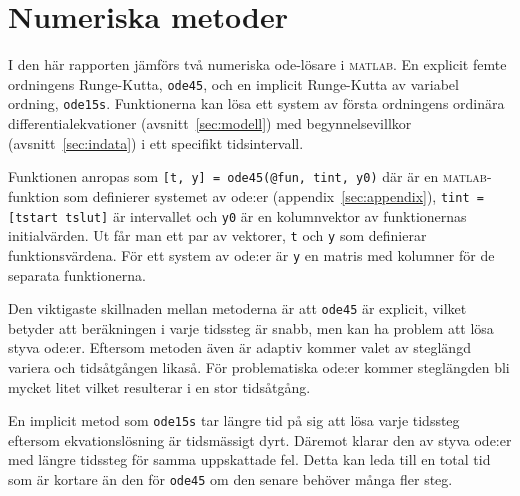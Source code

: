 \section{Numeriska metoder}
\label{sec:metoder}

I den här rapporten jämförs två numeriska ode-lösare i \textsc{matlab}. En explicit femte ordningens Runge-Kutta, \texttt{ode45}, och en implicit Runge-Kutta av variabel ordning, \texttt{ode15s}. Funktionerna kan lösa ett system av första ordningens ordinära differentialekvationer (avsnitt~\ref{sec:modell}) med begynnelsevillkor (avsnitt~\ref{sec:indata}) i ett specifikt tidsintervall.

Funktionen anropas som \texttt{[t, y] = ode45(@fun, tint, y0)} där  är en \textsc{matlab}-funktion som definierer systemet av ode:er (appendix~\ref{sec:appendix}), \texttt{tint = [tstart tslut]} är intervallet och \texttt{y0} är en kolumnvektor av funktionernas initialvärden. Ut får man ett par av vektorer, \texttt{t} och \texttt{y} som definierar funktionsvärdena. För ett system av ode:er är \texttt{y} en matris med kolumner för de separata funktionerna.


Den viktigaste skillnaden mellan metoderna är att \texttt{ode45} är explicit, vilket betyder att beräkningen i varje tidssteg är snabb, men kan ha problem att lösa styva ode:er. Eftersom
metoden även är adaptiv kommer valet av steglängd variera och tidsåtgången likaså. För problematiska ode:er kommer steglängden bli mycket litet vilket resulterar i en stor tidsåtgång.

En implicit metod som \texttt{ode15s} tar längre tid på sig att lösa varje tidssteg eftersom ekvationslösning är tidsmässigt dyrt. Däremot klarar den av styva ode:er med längre tidssteg för samma uppskattade fel. Detta kan leda till en total tid som är kortare än den för \texttt{ode45} om den senare behöver många fler steg.
